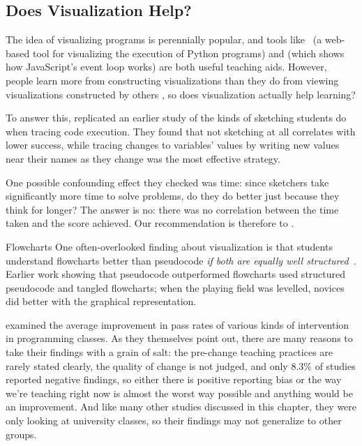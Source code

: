 \subsection*{Does Visualization Help?}

The idea of visualizing programs is perennially popular, and tools like~\cite{Guo2013} (a web-based tool for visualizing the execution of Python programs) and  (which shows how JavaScript's event loop works) are both useful teaching aids. However, people learn more from constructing visualizations than they do from viewing visualizations constructed by others \cite{Stas1998,Ceti2016}, so does visualization actually help learning?

To answer this, \cite{Cunn2017} replicated an earlier study of the kinds of sketching students do when tracing code execution. They found that not sketching at all correlates with lower success, while tracing changes to variables' values by writing new values near their names as they change was the most effective strategy.

One possible confounding effect they checked was time: since sketchers take significantly more time to solve problems, do they do better just because they think for longer? The answer is no: there was no correlation between the time taken and the score achieved. Our recommendation is therefore to .

\begin{aside}{Flowcharts}
  One often-overlooked finding about visualization is that students understand flowcharts better than pseudocode \emph{if both are equally well structured}~\cite{Scan1989}. Earlier work showing that pseudocode outperformed flowcharts used structured pseudocode and tangled flowcharts; when the playing field was levelled, novices did better with the graphical representation.
\end{aside}


\cite{Viha2014} examined the average improvement in pass rates of various kinds of intervention in programming classes. As they themselves point out, there are many reasons to take their findings with a grain of salt: the pre-change teaching practices are rarely stated clearly, the quality of change is not judged, and only 8.3\% of studies reported negative findings, so either there is positive reporting bias or the way we're teaching right now is almost the worst way possible and anything would be an improvement. And like many other studies discussed in this chapter, they were only looking at university classes, so their findings may not generalize to other groups.

